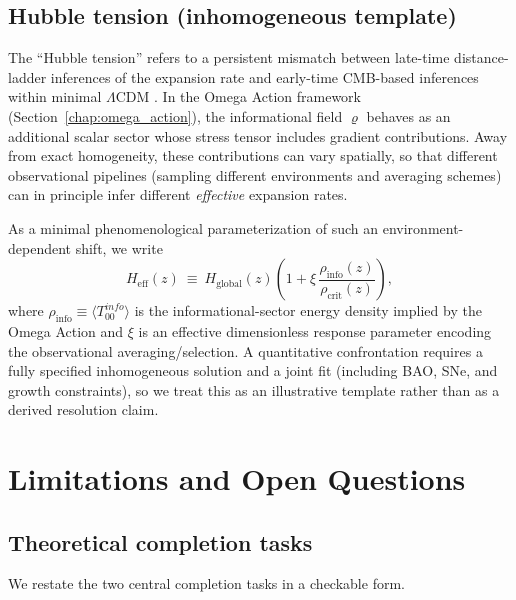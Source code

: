 \subsection{Hubble tension (inhomogeneous template)}
The ``Hubble tension'' refers to a persistent mismatch between late-time distance-ladder inferences of the expansion rate and early-time CMB-based inferences within minimal $\Lambda$CDM \cite{VerdeTreuRiess2019H0,Planck2018CosmoParams}. In the Omega Action framework (Section~\ref{chap:omega_action}), the informational field $\varrho$ behaves as an additional scalar sector whose stress tensor includes gradient contributions. Away from exact homogeneity, these contributions can vary spatially, so that different observational pipelines (sampling different environments and averaging schemes) can in principle infer different \emph{effective} expansion rates.
\par\noindent
As a minimal phenomenological parameterization of such an environment-dependent shift, we write
\begin{equation}
    H_{\mathrm{eff}}(z)\ \equiv\ H_{\mathrm{global}}(z)\left(1+\xi\,\frac{\rho_{\mathrm{info}}(z)}{\rho_{\mathrm{crit}}(z)}\right),
\end{equation}
where $\rho_{\mathrm{info}}\equiv \langle T_{00}^{info}\rangle$ is the informational-sector energy density implied by the Omega Action and $\xi$ is an effective dimensionless response parameter encoding the observational averaging/selection. A quantitative confrontation requires a fully specified inhomogeneous solution and a joint fit (including BAO, SNe, and growth constraints), so we treat this as an illustrative template rather than as a derived resolution claim.

\section{Limitations and Open Questions}
\label{chap:limitations}

\subsection{Theoretical completion tasks}
We restate the two central completion tasks in a checkable form.

